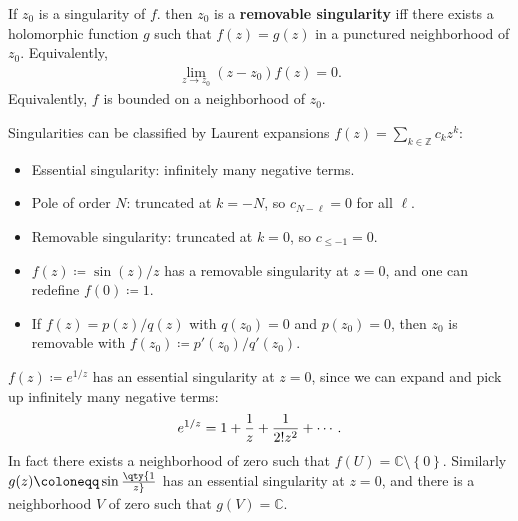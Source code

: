 \begin{definition}

If \(z_0\) is a singularity of \(f\). then \(z_0\) is a
\textbf{removable singularity} iff there exists a holomorphic function
\(g\) such that \(f(z) = g(z)\) in a punctured neighborhood of \(z_0\).
Equivalently,
\begin{align*}
\lim_{z\to z_0}(z-z_0) f(z) = 0
.\end{align*}
Equivalently, \(f\) is bounded on a neighborhood of \(z_0\).

\end{definition}

\begin{remark}

Singularities can be classified by Laurent expansions
\(f(z) = \sum_{k\in {\mathbb{Z}}} c_k z^k\):

\begin{itemize}
\tightlist
\item
  Essential singularity: infinitely many negative terms.
\item
  Pole of order \(N\): truncated at \(k = -N\), so \(c_{N-\ell} = 0\)
  for all \(\ell\).
\item
  Removable singularity: truncated at \(k=0\), so \(c_{\leq -1} = 0\).
\end{itemize}

\end{remark}

\begin{example}

\envlist

\begin{itemize}
\tightlist
\item
  \(f(z) \coloneqq\sin(z)/z\) has a removable singularity at \(z=0\),
  and one can redefine \(f(0) \coloneqq 1\).
\item
  If \(f(z) = p(z)/q(z)\) with \(q(z_0)=0\) and \(p(z_0)=0\), then
  \(z_0\) is removable with \(f(z_0)\coloneqq p'(z_0)/q'(z_0)\).
\end{itemize}

\end{example}

\begin{example}

\(f(z) \coloneqq e^{1/z}\) has an essential singularity at \(z=0\),
since we can expand and pick up infinitely many negative terms:
\begin{align*}
e^{1/z} = 1 + {1\over z} + {1\over 2! z^2} + \cdots
.\end{align*}
In fact there exists a neighborhood of zero such that
\(f(U) = {\mathbb{C}}\setminus\left\{{0}\right\}\). Similarly
\(g(z) \coloneqq\sin\qty{1\over z}\) has an essential singularity at
\(z=0\), and there is a neighborhood \(V\) of zero such that
\(g(V) = {\mathbb{C}}\).

\end{example}

